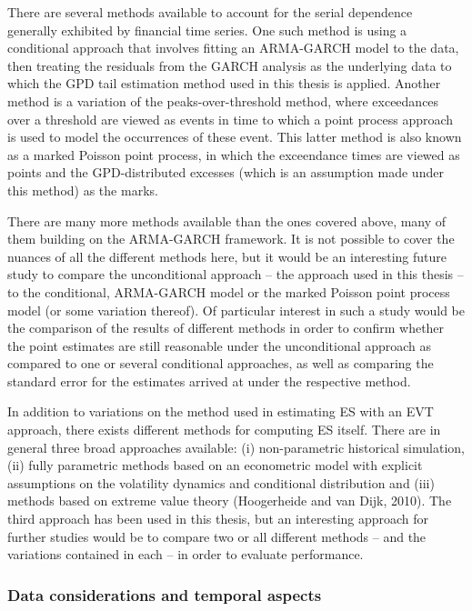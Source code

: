 \documentclass[a4paper,11pt]{article}
\theoremstyle{definition}
\theoremstyle{definition}
\theoremstyle{definition}
\theoremstyle{definition}
\theoremstyle{remark}
\begin{document}
There are several methods available to account for the serial dependence generally exhibited by financial time series. One such method is using a conditional approach that involves fitting an ARMA-GARCH model to the data, then treating the residuals from the GARCH analysis as the underlying data to which the GPD tail estimation method used in this thesis is applied. Another method is a variation of the peaks-over-threshold method, where exceedances over a threshold are viewed as events in time to which a point process approach is used to model the occurrences of these event. This latter method is also known as a marked Poisson point process, in which the exceendance times are viewed as points and the GPD-distributed excesses (which is an assumption made under this method) as the marks.

There are many more methods available than the ones covered above, many of them building on the ARMA-GARCH framework. It is not possible to cover the nuances of all the different methods here, but it would be an interesting future study to compare the unconditional approach -- the approach used in this thesis -- to the conditional, ARMA-GARCH model or the marked Poisson point process model (or some variation thereof). Of particular interest in such a study would be the comparison of the results of different methods in order to confirm whether the point estimates are still reasonable under the unconditional approach as compared to one or several conditional approaches, as well as comparing the standard error for the estimates arrived at under the respective method.

In addition to variations on the method used in estimating ES with an EVT approach, there exists different methods for computing ES itself. There are in general three broad approaches available: (i) non-parametric historical simulation, (ii) fully parametric methods based on an econometric model with explicit assumptions on the volatility dynamics and conditional distribution and (iii) methods based on extreme value theory (Hoogerheide and van Dijk, 2010). The third approach has been used in this thesis, but an interesting approach for further studies would be to compare two or all different methods -- and the variations contained in each -- in order to evaluate performance.

\hypertarget{data-considerations-and-temporal-aspects}{%
\subsubsection{Data considerations and temporal aspects}\label{data-considerations-and-temporal-aspects}}
\end{document}
